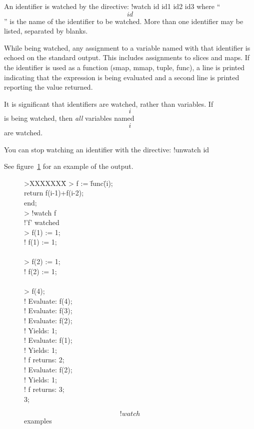 {    An identifier is watched by the directive:
	\nopagebreak
	\DS
	!watch id id1 id2 id3
	\DE
    where ``\[id\]'' is the name of the identifier to be watched.
    More than one identifier may be listed, separated by blanks.

    While being watched, any assignment to a variable named with that
    identifier is echoed on the standard output.
    This includes assignments to slices and maps.
    If the identifier is used as a function
    (smap, mmap, tuple, func), a line is printed indicating that the
    expression is being evaluated and a second line is printed
    reporting the value returned.

    It is significant that identifiers are watched, rather than
    variables.
    If \[i\] is being watched, then {\em all\/} variables named \[i\]
    are watched.

    You can stop watching an identifier with the directive:
	\nopagebreak
	\DS
	!unwatch id
	\DE
    
    See figure~\ref{watch} for an example of the output.

    \begin{figure}[hbp]
	\DS
	    >XXXXXXX\= \kill
	    >	\>f := \=func\=(i); \\
		    \>     \>    \> return f(i-1)+f(i-2);\\
		    \>     \>end;\\
	    >	\>!watch f\\
	    !'f' watched\\
	    >	\>f(1) := 1;\\
	    ! f(1) := 1;\\
	    \\
	    >	\>f(2) := 1;\\
	    ! f(2) := 1;\\
	    \\
	    >	\>f(4);\\
	    ! Evaluate: f(4);\\
	    ! Evaluate: f(3);\\
	    ! Evaluate: f(2);\\
	    ! Yields: 1;\\
	    ! Evaluate: f(1);\\
	    ! Yields: 1;\\
	    ! f returns: 2;\\
	    ! Evaluate: f(2);\\
	    ! Yields: 1;\\
	    ! f returns: 3;\\
	    3;
	\DE
	\caption{\[!watch\] examples\label{watch}}
    \end{figure}

}
